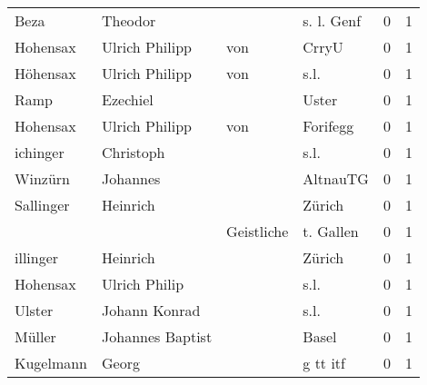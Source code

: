 \documentclass[10pt,a4paper,landscape]{article}
\begin{document}
\begin{longtable}{llllrr}
                     Beza &                            Theodor &             &                                  s. l. Genf &          0 &         1 \\
                 Hohensax &                     Ulrich Philipp &         von &                                       CrryU &          0 &         1 \\
                 Höhensax &                     Ulrich Philipp &         von &                                        s.l. &          0 &         1 \\
                     Ramp &                           Ezechiel &             &                                       Uster &          0 &         1 \\
                 Hohensax &                     Ulrich Philipp &         von &                                    Forifegg &          0 &         1 \\
                 ichinger &                          Christoph &             &                                        s.l. &          0 &         1 \\
                  Winzürn &                           Johannes &             &                                    AltnauTG &          0 &         1 \\
                Sallinger &                           Heinrich &             &                                      Zürich &          0 &         1 \\
                          &                                    &  Geistliche &                                   t. Gallen &          0 &         1 \\
                 illinger &                           Heinrich &             &                                      Zürich &          0 &         1 \\
                 Hohensax &                      Ulrich Philip &             &                                        s.l. &          0 &         1 \\
                   Ulster &                      Johann Konrad &             &                                        s.l. &          0 &         1 \\
                   Müller &                   Johannes Baptist &             &                                       Basel &          0 &         1 \\
                Kugelmann &                              Georg &             &                                    g tt itf &          0 &         1 \\

\end{longtable}
\end{document}
